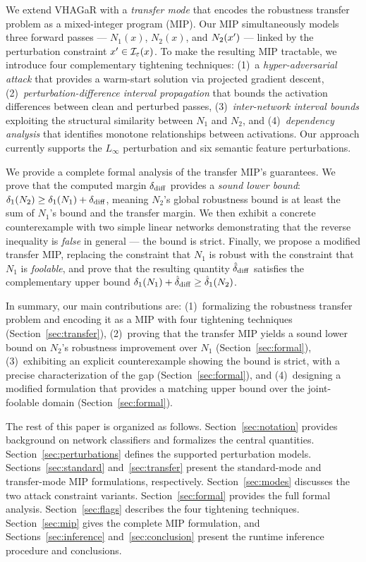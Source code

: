 We extend VHAGaR with a \emph{transfer mode} that encodes the robustness transfer problem as a mixed-integer program (MIP). Our MIP simultaneously models three forward passes --- $N_1(x)$, $N_2(x)$, and $N_2(x')$ --- linked by the perturbation constraint $x' \in \mathcal{I}_\varepsilon(x)$. To make the resulting MIP tractable, we introduce four complementary tightening techniques: (1)~a \emph{hyper-adversarial attack} that provides a warm-start solution via projected gradient descent, (2)~\emph{perturbation-difference interval propagation} that bounds the activation differences between clean and perturbed passes, (3)~\emph{inter-network interval bounds} exploiting the structural similarity between $N_1$ and $N_2$, and (4)~\emph{dependency analysis} that identifies monotone relationships between activations. Our approach currently supports the $L_\infty$ perturbation and six semantic feature perturbations.

We provide a complete formal analysis of the transfer MIP's guarantees. We prove that the computed margin $\delta_{\mathrm{diff}}$ provides a \emph{sound lower bound}: $\delta_1(N_{2}) \geq \delta_1(N_{1}) + \delta_{\mathrm{diff}}$, meaning $N_2$'s global robustness bound is at least the sum of $N_1$'s bound and the transfer margin. We then exhibit a concrete counterexample with two simple linear networks demonstrating that the reverse inequality is \emph{false} in general --- the bound is strict. Finally, we propose a modified transfer MIP, replacing the constraint that $N_1$ is robust with the constraint that $N_1$ is \emph{foolable}, and prove that the resulting quantity $\hat{\delta}_{\mathrm{diff}}$ satisfies the complementary upper bound $\delta_1(N_{1}) + \hat{\delta}_{\mathrm{diff}} \geq \hat{\delta}_1(N_{2})$.

In summary, our main contributions are:
(1)~formalizing the robustness transfer problem and encoding it as a MIP with four tightening techniques (Section~\ref{sec:transfer}),
(2)~proving that the transfer MIP yields a sound lower bound on $N_2$'s robustness improvement over $N_1$ (Section~\ref{sec:formal}),
(3)~exhibiting an explicit counterexample showing the bound is strict, with a precise characterization of the gap (Section~\ref{sec:formal}), and
(4)~designing a modified formulation that provides a matching upper bound over the joint-foolable domain (Section~\ref{sec:formal}).

The rest of this paper is organized as follows. Section~\ref{sec:notation} provides background on network classifiers and formalizes the central quantities. Section~\ref{sec:perturbations} defines the supported perturbation models. Sections~\ref{sec:standard} and~\ref{sec:transfer} present the standard-mode and transfer-mode MIP formulations, respectively. Section~\ref{sec:modes} discusses the two attack constraint variants. Section~\ref{sec:formal} provides the full formal analysis. Section~\ref{sec:flags} describes the four tightening techniques. Section~\ref{sec:mip} gives the complete MIP formulation, and Sections~\ref{sec:inference} and~\ref{sec:conclusion} present the runtime inference procedure and conclusions.
